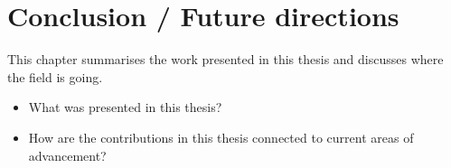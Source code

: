 \chapter{Conclusion / Future directions}

\ifpdf
    \graphicspath{{Chapter7/Figs/Raster/}{Chapter7/Figs/PDF/}{Chapter7/Figs/}}
\else
    \graphicspath{{Chapter7/Figs/Vector/}{Chapter7/Figs/}}
\fi

This chapter summarises the work presented in this thesis and discusses where the field is going.

\begin{itemize}
	\item What was presented in this thesis?
	\item How are the contributions in this thesis connected to current areas of advancement?
\end{itemize}